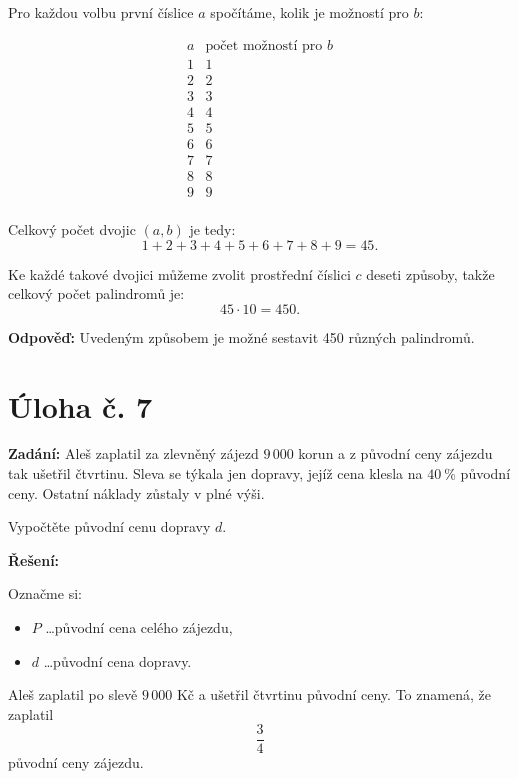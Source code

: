 \documentclass[12pt,a4paper]{article}
\begin{document}
\medskip

Pro každou volbu první číslice \(a\) spočítáme, kolik je možností pro \(b\):

\[
\begin{array}{c|c}
a & \text{počet možností pro } b \\
\hline
1 & 1 \\
2 & 2 \\
3 & 3 \\
4 & 4 \\
5 & 5 \\
6 & 6 \\
7 & 7 \\
8 & 8 \\
9 & 9 \\
\end{array}
\]

Celkový počet dvojic \((a,b)\) je tedy:
\[
1+2+3+4+5+6+7+8+9=45.
\]

Ke každé takové dvojici můžeme zvolit prostřední číslici \(c\) deseti způsoby, takže celkový počet palindromů je:
\[
45\cdot 10=450.
\]

\bigskip

\textbf{Odpověď:}  
Uvedeným způsobem je možné sestavit 450 různých palindromů.


\newpage
\section*{Úloha č. 7}

\textbf{Zadání:}  
Aleš zaplatil za zlevněný zájezd \(9\,000\) korun a z původní ceny zájezdu tak ušetřil čtvrtinu. Sleva se týkala jen dopravy, jejíž cena klesla na \(40\ \%\) původní ceny. Ostatní náklady zůstaly v plné výši.

Vypočtěte původní cenu dopravy \(d\).

\bigskip

\textbf{Řešení:}

Označme si:
\begin{itemize}
    \item \(P\) \dots původní cena celého zájezdu,
    \item \(d\) \dots původní cena dopravy.
\end{itemize}

Aleš zaplatil po slevě \(9\,000\) Kč a ušetřil čtvrtinu původní ceny. To znamená, že zaplatil
\[
\frac{3}{4}
\]
původní ceny zájezdu.
\end{document}
